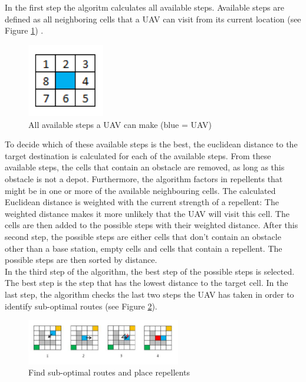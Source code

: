 In the first step the algoritm calculates all available steps. Available steps are defined as all neighboring cells that a UAV can visit from its current location (see Figure \ref{fig:algo_steps})
.
\begin{figure}[htbp]\label{fig:algo_steps}
	\centering
	\includegraphics[width=0.3\textwidth]{images/algorithm_Picture2.png}
	\caption{All available steps a UAV can make (blue = UAV)} 
\end{figure}

To decide which of these available steps is the best, the euclidean distance to the target destination is calculated for each of the available steps. From these available steps, the cells that contain an obstacle are removed, as long as this obstacle is not a depot. Furthermore, the algorithm factors in repellents that might be in one or more of the available neighbouring cells.  
The calculated Euclidean distance is weighted with the current strength of a repellent:
\newline
The weighted distance makes it more unlikely that the UAV will visit this cell. 
The cells are then added to the possible steps with their weighted distance.
After this second step, the possible steps are either cells that don't contain an obstacle other than a base station, empty cells and cells that contain a repellent. The possible steps are then sorted by distance.
\\
In the third step of the algorithm, the best step of the possible steps is selected. The best step is the step that has the lowest distance to the target cell. In the last step, the algorithm checks the last two steps the UAV has taken in order to identify sub-optimal routes (see Figure \ref{fig:algo_find_routes}).

\begin{figure}[htbp]\label{fig:algo_find_routes}
	\centering
	\includegraphics[width=0.6\textwidth]{images/algorithm_Picture3.png}
	\caption{Find sub-optimal routes and place repellents} 
\end{figure}

